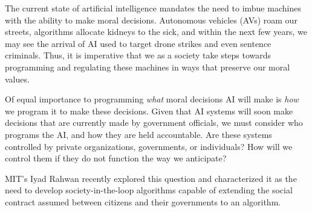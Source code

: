 The current state of artificial intelligence mandates the need to imbue machines with the ability to make moral decisions. Autonomous vehicles (AVs) roam our streets\cite{teslaSelfDrivingCar, uberSelfDrivingCar}, algorithms allocate kidneys to the sick, and within the next few years, we may see the arrival of AI used to target drone strikes and even sentence criminals. Thus, it is imperative that we as a society take steps towards programming and regulating these machines in ways that preserve our moral values. \begin{comment}-- failure to do so could be the difference between life and death. (cheesy, I know. Need to fix). \end{comment}

Of equal importance to programming \textit{what} moral decisions AI will make is \textit{how} we program it to make these decisions. Given that AI systems will soon make decisions that are currently made by government officials, we must consider who programs the AI, and how they are held accountable. Are these systems controlled by private organizations, governments, or individuals? How will we control them if they do not function the way we anticipate? 

MIT's Iyad Rahwan recently explored this question and characterized it as the need to develop society-in-the-loop algorithms capable of extending the social contract assumed between citizens and their governments to an algorithm. 

